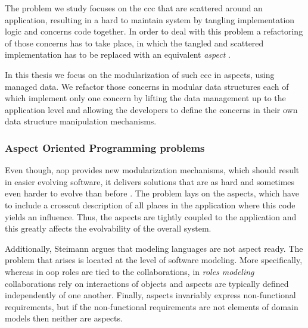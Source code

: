 The problem we study focuses on the \ac{ccc} that are scattered around an application, resulting in a hard to maintain system by tangling implementation logic and concerns code together. 
In order to deal with this problem a refactoring of those concerns has to take place, in which the tangled and scattered implementation has to be replaced with an equivalent \textit{aspect} \cite{hannemann2005role}.

In this thesis we focus on the modularization of such \ac{ccc} in aspects, using managed data. 
We refactor those concerns in modular data structures each of which implement only one concern by lifting the data management up to the application level and allowing the developers to define the concerns in their own data structure manipulation mechanisms.

\subsubsection{Aspect Oriented Programming problems}\label{Aspect Oriented Programming problem}

Even though, \ac{aop} provides new modularization mechanisms, which should result in easier evolving software, 
it delivers solutions that are as hard and sometimes even harder to evolve than before \cite{tourwe2003existence}. 
The problem lays on the aspects, which have to include a crosscut description of all places in the application where this code yields an influence. 
Thus, the aspects are tightly coupled to the application and this greatly affects the evolvability of the overall system. 

Additionally, Steimann \cite{steimann2005domain} argues that modeling languages are not aspect ready. 
The problem that arises is located at the level of software modeling. 
More specifically, whereas in \ac{oop} roles are tied to the collaborations, in \textit{roles modeling} collaborations rely on interactions of objects and aspects are typically defined independently of one another.
Finally, aspects invariably express non-functional requirements, but if the non-functional requirements are not elements of domain models then neither are aspects.

